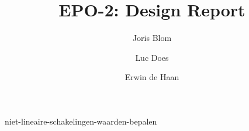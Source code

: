 \documentclass{report}
\title{EPO-2: Design Report}
\author{Joris Blom \and Luc Does \and Erwin de Haan}
\begin{document}
\maketitle
\newpage
{}

\tableofcontents

\newpage
{}

{niet-lineaire-schakelingen-waarden-bepalen}


\printbibliography
\end{document}
